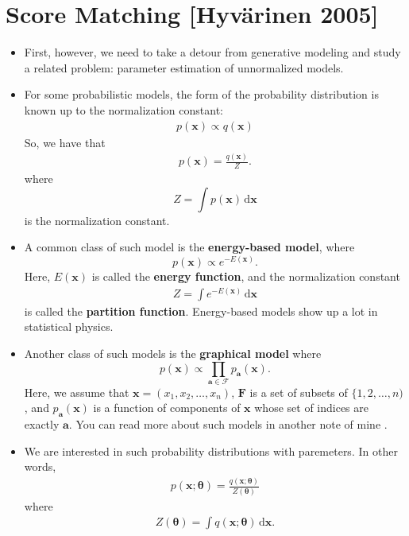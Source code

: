 \documentclass[10pt]{article}
\newcommand{\dee}{\mathrm{d}}
\newcommand{\ve}[1]{\mathbf{#1}}
\begin{document}
\section{Score Matching [Hyv\"{a}rinen 2005]}

\begin{itemize}
  \item First, however, we need to take a detour from generative modeling and study a related problem: parameter estimation of unnormalized models.
  
  \item For some probabilistic models, the form of the probability distribution is known up to the normalization constant:
  \begin{align*}
      p(\ve{x}) \propto q(\ve{x})
  \end{align*}
  So, we have that
  \begin{align*}
      p(\ve{x}) = \frac{q(\ve{x})}{Z}.
  \end{align*}
  where $$Z = \int p(\ve{x})\, \dee\ve{x}$$ is the normalization constant.

  \item A common class of such model is the {\bf energy-based model}, where $$p(\ve{x}) \propto e^{-E(\ve{x})}.$$ Here, $E(\ve{x})$ is called the {\bf energy function}, and the normalization constant
  \begin{align*}
  Z = \int e^{-E(\ve{x})}\, \dee\ve{x}
  \end{align*}
  is called the {\bf partition function}. Energy-based models show up a lot in statistical physics.

  \item Another class of such models is the {\bf graphical model} where $$p(\ve{x}) \propto \prod_{\ve{a} \in \mathcal{F}} p_\ve{a}(\ve{x}).$$ Here, we assume that $\ve{x} = (x_1, x_2, \dotsc, x_n)$, $\ve{F}$ is a set of subsets of $\{1,2,\dotsc,n)$, and $p_\ve{a}(\ve{x})$ is a function of components of $\ve{x}$ whose set of indices are exactly $\ve{a}$. You can read more about such models in another note of mine \cite{KhungurnCrf}.
  
  \item We are interested in such probability distributions with paremeters. In other words,
  \begin{align*}
      p(\ve{x};\boldsymbol{\theta}) = \frac{q(\ve{x};\boldsymbol{\theta})}{Z(\boldsymbol{\theta})}
  \end{align*}
  where
  \begin{align*}
      Z(\boldsymbol{\theta}) = \int q(\ve{x};\boldsymbol{\theta})\, \dee\ve{x}.
  \end{align*}


\end{itemize}
\end{document}
